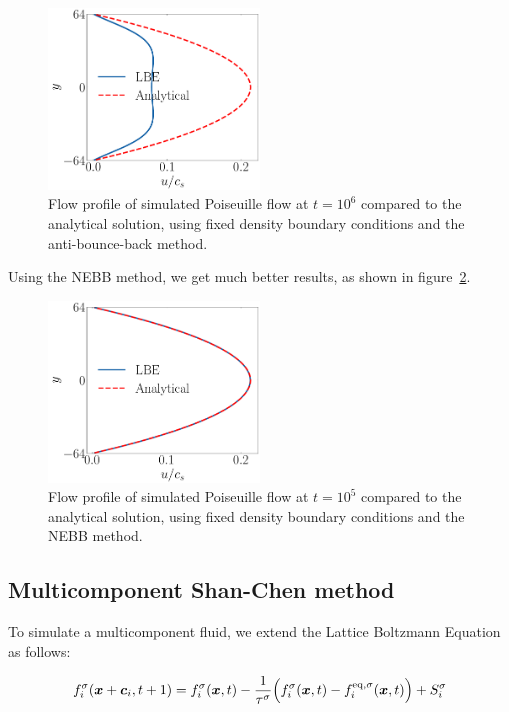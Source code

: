 \begin{figure}[htp]
    \centering
    \includegraphics[width=0.5\textwidth]{figures/poiseuille-pressure.pdf}
    \caption{Flow profile of simulated Poiseuille flow at $t=10^6$ compared to the analytical solution, using fixed density boundary conditions and the anti-bounce-back method.}\label{fig:poiseuille-pressure}
\end{figure}

Using the NEBB method, we get much better results, as shown in figure~\ref{fig:poiseuille-pressure-NEBB}.

\begin{figure}[htp]
    \centering
    \includegraphics[width=0.5\textwidth]{figures/poiseuille-pressure-NEBB.pdf}
    \caption{Flow profile of simulated Poiseuille flow at $t=10^5$ compared to the analytical solution, using fixed density boundary conditions and the NEBB method.}\label{fig:poiseuille-pressure-NEBB}
\end{figure}

\subsection{Multicomponent Shan-Chen method}
To simulate a multicomponent fluid, we extend the Lattice Boltzmann Equation as follows:

\begin{equation}\label{eq:Lattice Boltzmann Equation multicomponent}
    f_i^{\sigma}(\bm{x} + \bm{c}_i, t + 1) = f_i^{\sigma}(\bm{x}, t) - \frac{1}{\tau^{\sigma}}\Bigl(f_i^{\sigma}(\bm{x}, t) - f_i^{\text{eq}, \sigma}(\bm{x}, t)\Bigr) + S_i^{\sigma} 
\end{equation}

